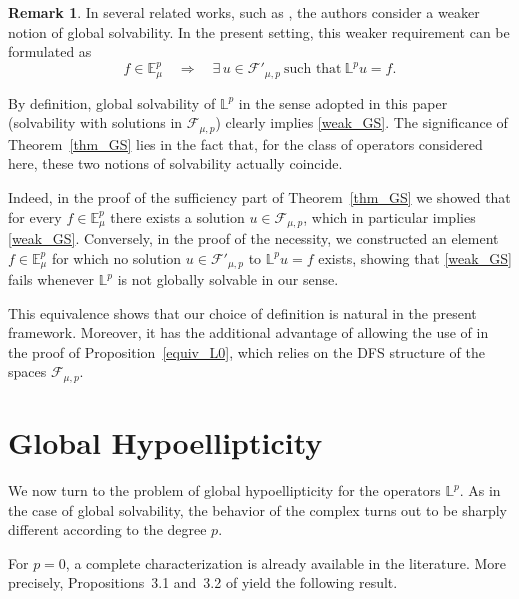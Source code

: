 \documentclass[12pt,reqno]{amsart}
\theoremstyle{definition}
\newtheorem{remark}[theorem]{Remark}
\numberwithin{equation}{section}
\begin{document}
\begin{remark}
	In several related works, such as
	\cite{ALMed24,AviMed25,BerPet99jmaa},
	the authors consider a weaker notion of global solvability.
	In the present setting, this weaker requirement can be formulated as
	\begin{equation}\label{weak_GS}
		f \in \mathbb{E}_\mu^p
		\quad \Longrightarrow \quad
		\exists\, u \in \mathscr{F}'_{\mu,p}
		\ \text{such that}\ 
		\mathbb{L}^p u = f .
	\end{equation}
	
	By definition, global solvability of $\mathbb{L}^p$ in the sense adopted in
	this paper (solvability with solutions in $\mathscr{F}_{\mu,p}$)
	clearly implies \eqref{weak_GS}.
	The significance of Theorem~\ref{thm_GS} lies in the fact that, for the class
	of operators considered here, these two notions of solvability actually
	coincide.
	
	Indeed, in the proof of the sufficiency part of Theorem~\ref{thm_GS} we showed
	that for every $f \in \mathbb{E}_\mu^p$ there exists a solution
	$u \in \mathscr{F}_{\mu,p}$, which in particular implies \eqref{weak_GS}.
	Conversely, in the proof of the necessity, we constructed an element
	$f \in \mathbb{E}_\mu^p$ for which no solution
	$u \in \mathscr{F}'_{\mu,p}$ to $\mathbb{L}^p u = f$ exists, showing that
	\eqref{weak_GS} fails whenever $\mathbb{L}^p$ is not globally solvable in our
	sense.
	
	This equivalence shows that our choice of definition is natural in the
	present framework.
	Moreover, it has the additional advantage of allowing the use of
	\cite[Lemma~2.2]{Araujo2017} in the proof of
	Proposition~\ref{equiv_L0}, which relies on the DFS structure of the spaces
	$\mathscr{F}_{\mu,p}$.
\end{remark}

\section{Global Hypoellipticity}\label{sec-hypoellipticity}

We now turn to the problem of global hypoellipticity for the operators
$\mathbb{L}^p$.
As in the case of global solvability, the behavior of the complex turns out
to be sharply different according to the degree $p$.

For $p=0$, a complete characterization is already available in the
literature.
More precisely, Propositions~3.1 and~3.2 of \cite{AviCapKir25} yield the
following result.
\end{document}
